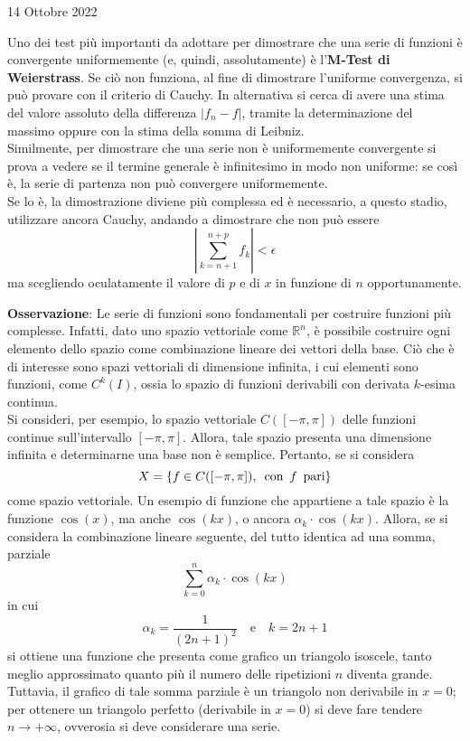 \documentclass[a4paper]{extarticle}
\begin{document}
\newpage
\noindent
\begin{center}
    14 Ottobre 2022
\end{center}
Uno dei test più importanti da adottare per dimostrare che una serie di funzioni è convergente uniformemente (e, quindi, assolutamente) è l'\textbf{M-Test di Weierstrass}. Se ciò non funziona, al fine di dimostrare l'uniforme convergenza, si può provare con il criterio di Cauchy. In alternativa si cerca di avere una stima del valore assoluto della differenza $\left \vert f_n - f \right \vert$, tramite la determinazione del massimo oppure con la stima della somma di Leibniz.\\
Similmente, per dimostrare che una serie non è uniformemente convergente si prova a vedere se il termine generale è infinitesimo in modo non uniforme: se così è, la serie di partenza non può convergere uniformemente.\\
Se lo è, la dimostrazione diviene più complessa ed è necessario, a questo stadio, utilizzare ancora Cauchy, andando a dimostrare che non può essere
\[\left \vert \sum_{k=n+1}^{n+p} f_k \right \vert < \epsilon\]
ma scegliendo oculatamente il valore di $p$ e di $x$ in funzione di $n$ opportunamente.

\vspace{1em}
\noindent
\textbf{Osservazione}: Le serie di funzioni sono fondamentali per costruire funzioni più complesse. Infatti, dato uno spazio vettoriale come $\mathbb{R}^n$, è possibile costruire ogni elemento dello spazio come combinazione lineare dei vettori della base. Ciò che è di interesse sono spazi vettoriali di dimensione infinita, i cui elementi sono funzioni, come $C^k(I)$, ossia lo spazio di funzioni derivabili con derivata $k$-esima continua.\\
Si consideri, per esempio, lo spazio vettoriale $C([-\pi,\pi])$ delle funzioni continue sull'intervallo $[-\pi,\pi]$. Allora, tale spazio presenta una dimensione infinita e determinarne una base non è semplice. Pertanto, se si considera
\[X = \{f \in C([-\pi,\pi]), \hspace{0.5em} \text{con} \hspace{0.5em} f \hspace{0.5em} \text{pari}\}\]
come spazio vettoriale. Un esempio di funzione che appartiene a tale spazio è la funzione $\cos(x)$, ma anche $\cos(kx)$, o ancora $\alpha_k \cdot \cos(k x)$. Allora, se si considera la combinazione lineare seguente, del tutto identica ad una somma, parziale
\[\sum_{k=0}^{n} \alpha_k \cdot \cos(kx)\]
in cui
\[\alpha_k = \frac{1}{(2n+1)^2} \hspace{1em} \text{e} \hspace{1em} k=2n+1\]
si ottiene una funzione che presenta come grafico un triangolo isoscele, tanto meglio approssimato quanto più il numero delle ripetizioni $n$ diventa grande. Tuttavia, il grafico di tale somma parziale è un triangolo non derivabile in $x=0$; per ottenere un triangolo perfetto (derivabile in $x=0$) si deve fare tendere $n \to +\infty$, ovverosia si deve considerare una serie.
\end{document}
